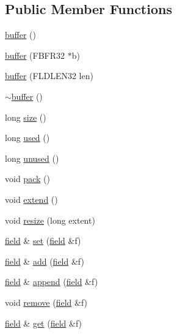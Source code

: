 \subsection*{Public Member Functions}
\begin{DoxyCompactItemize}
\item 
\hyperlink{classatmi_1_1buffer_ab5a434d367c856f9b1b7c831b98ff0d3}{buffer} ()
\item 
\hyperlink{classatmi_1_1buffer_a5a2836413da6d30d25afa2ea242cd90d}{buffer} (F\+B\+F\+R32 $\ast$b)
\item 
\hyperlink{classatmi_1_1buffer_ae2bc183e6b0909b8155dcfa17686a574}{buffer} (F\+L\+D\+L\+E\+N32 len)
\item 
\hyperlink{classatmi_1_1buffer_aa58097eacc94f1f5cc5e99b434ec7135}{$\sim$buffer} ()
\item 
long \hyperlink{classatmi_1_1buffer_a5ee67d265b7919363d71cf00af79e598}{size} ()
\item 
long \hyperlink{classatmi_1_1buffer_a2bac749e70e7ce6967be7abadfe85ffe}{used} ()
\item 
long \hyperlink{classatmi_1_1buffer_a7f6deadb4060641ad16aa242f787758e}{unused} ()
\item 
void \hyperlink{classatmi_1_1buffer_ab9294b1a1e54e35717db40cb6bbb6de1}{pack} ()
\item 
void \hyperlink{classatmi_1_1buffer_a853e2a0585dda4e23ffa04297b824afb}{extend} ()
\item 
void \hyperlink{classatmi_1_1buffer_a669b48d7cbabc7bc45608ab9343c0c51}{resize} (long extent)
\item 
\hyperlink{classatmi_1_1field}{field} \& \hyperlink{classatmi_1_1buffer_a1fe98844cb17328390b3d4e658bd6903}{set} (\hyperlink{classatmi_1_1field}{field} \&f)
\item 
\hyperlink{classatmi_1_1field}{field} \& \hyperlink{classatmi_1_1buffer_a5f30826d8273b619380e8b4f039af094}{add} (\hyperlink{classatmi_1_1field}{field} \&f)
\item 
\hyperlink{classatmi_1_1field}{field} \& \hyperlink{classatmi_1_1buffer_a4a9abeb69354fa575c8b27c9af170e79}{append} (\hyperlink{classatmi_1_1field}{field} \&f)
\item 
void \hyperlink{classatmi_1_1buffer_a4a1ef484befbf22aca919fc1a312ab61}{remove} (\hyperlink{classatmi_1_1field}{field} \&f)
\item 
\hyperlink{classatmi_1_1field}{field} \& \hyperlink{classatmi_1_1buffer_affb14c05bc21e29c3a2f6dc03c30c0fa}{get} (\hyperlink{classatmi_1_1field}{field} \&f)
\item 

\end{DoxyCompactItemize}
